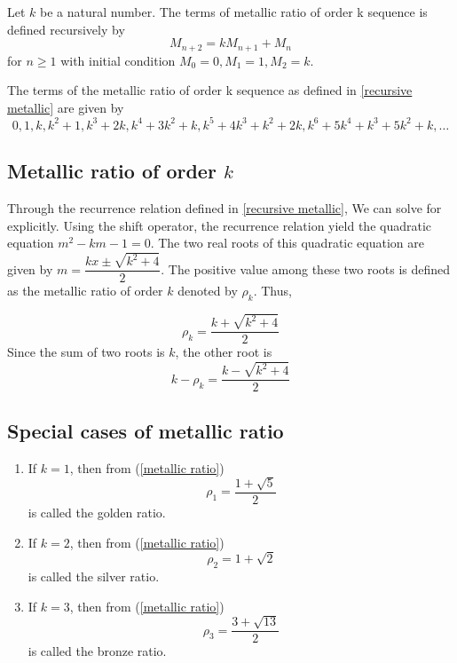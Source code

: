 \documentclass{rmutt-seminar}
\begin{document}
\begin{definition}
Let $ k $ be a natural number. The terms of metallic ratio of order k sequence is defined recursively by 
\begin{equation}\label{recursive metallic}
	 M_{n+2} =kM_{n+1}+M_n 
\end{equation}
for $n \geq 1 $ with initial condition $M_0 = 0, M_1 = 1, M_2 = k$. 

The terms of the metallic ratio of order k sequence as defined in \eqref{recursive metallic} are given by 
\begin{equation}\label{metallic ratio order k sequence}
	 0,1, k, k^2 + 1, k^3 + 2k, k^4 + 3k^2 + k, k^5 +4k^3 +k^2 + 2k, k^6 + 5k^4 + k^3 + 5k^2 + k, \ldots
\end{equation}

\subsection{Metallic ratio of order $k$ }
Through the recurrence relation defined in \eqref{recursive metallic}, We can solve for explicitly. Using the shift operator, the 
recurrence relation yield the quadratic equation $ m^2 - km - 1 = 0 $. The two real roots of this quadratic equation are 
given by $ m = \dfrac{kx \pm \sqrt{k^2 + 4} }{2}$. The positive value among these two roots is defined as the metallic ratio of order 
$ k $ denoted by $ \rho_{k} $. Thus,

 \begin{equation}\label{metallic ratio}
	\rho_{k} = \frac{k+\sqrt{k^2 + 4}}{2}
\end{equation}
Since the sum of two roots is $ k $, the other root is
 \begin{equation}\label{other root metallic ratio}
 	  k - \rho_k = \frac{k - \sqrt{k^2 + 4}}{2}
 \end{equation}

\subsection{Special cases of metallic ratio}
\begin{enumerate}[label=(\roman*)]

\item If $ k = 1$, then from (\ref{metallic ratio})
\begin{equation}\label{golden ratio}
	\rho_{1}=\frac{1+\sqrt{5}}{2}
\end{equation} 
is called the golden ratio.
\item If $ k = 2$, then from (\ref{metallic ratio})
\begin{equation}\label{silver ratio}
	\rho_{2}=1+\sqrt{2}
\end{equation} 
is called the silver ratio.
\item If $ k = 3$, then from (\ref{metallic ratio})
\begin{equation}\label{bronze ratio}
	\rho_{3}=\frac{3+\sqrt{13}}{2}
\end{equation}
 is called the bronze ratio.
\end{enumerate}

\end{definition}
\end{document}
